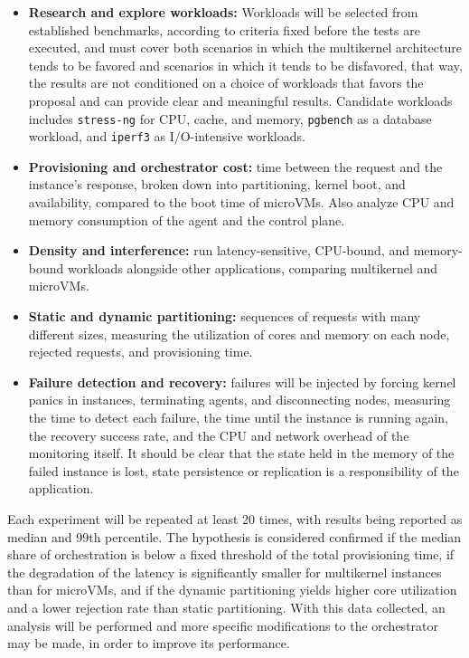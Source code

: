 \documentclass[12pt]{article}
\begin{document}
\begin{itemize}
  \item \textbf{Research and explore workloads:} Workloads will be selected from established benchmarks, according to
  criteria fixed before the tests are executed, and must cover both scenarios in which the multikernel architecture tends to
  be favored and scenarios in which it tends to be disfavored, that way, the results are not conditioned on a choice of
  workloads that favors the proposal and can provide clear and meaningful results.
  Candidate workloads includes \texttt{stress-ng} for CPU, cache, and memory, \texttt{pgbench} as a database workload,
  and \texttt{iperf3} as I/O-intensive workloads.
  \item \textbf{Provisioning and orchestrator cost:} time between the request and the instance's response,
  broken down into partitioning, kernel boot, and availability, compared to the boot
  time of microVMs. Also analyze CPU and memory consumption of the agent and the control plane.
  \item \textbf{Density and interference:} run latency-sensitive, CPU-bound, and memory-bound workloads alongside other
  applications, comparing multikernel and microVMs.
  \item \textbf{Static and dynamic partitioning:} sequences of requests with many different sizes,
  measuring the utilization of cores and memory on each node, rejected requests, and provisioning time.
  \item \textbf{Failure detection and recovery:} failures will be injected by forcing kernel panics in instances,
  terminating agents, and disconnecting nodes, measuring the time to detect each failure, the time until the
  instance is running again, the recovery success rate, and the CPU and network overhead of the monitoring itself.
  It should be clear that the state held in the memory of the failed instance is lost, state persistence or replication
  is a responsibility of the application.
\end{itemize}

Each experiment will be repeated at least 20 times, with results being reported as median and 99th percentile.
The hypothesis is considered confirmed if the median share of orchestration is below a fixed threshold of the total provisioning time,
if the degradation of the latency is significantly smaller for multikernel instances than for microVMs,
and if the dynamic partitioning yields higher core utilization and a lower rejection rate than static partitioning.
With this data collected, an analysis will be performed and more specific modifications to the orchestrator may be made,
in order to improve its performance.
\end{document}
